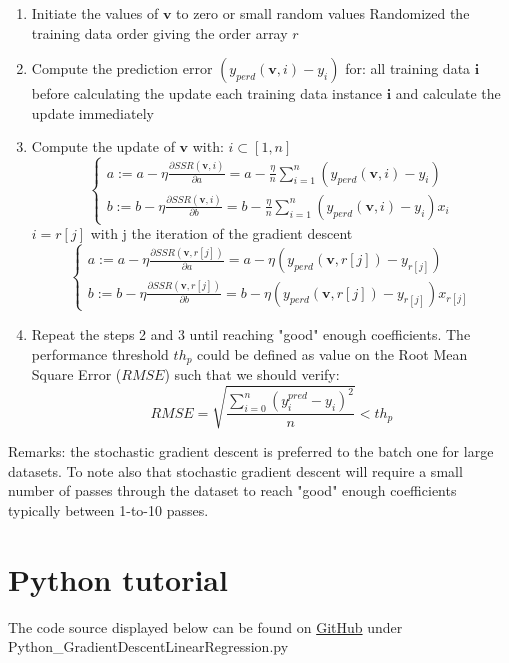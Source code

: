 \documentclass{article}
\begin{document}
\begin{enumerate}
  \item Initiate the values of \(\mathbf{v}\) to zero or small random values
     Randomized the training data order giving the order array \(r\)
  \item Compute the prediction error \((y_{perd}(\mathbf{v},i)-y_{i})\) for:
         all training data \(\mathbf{i}\) before calculating the update
         each training data instance \(\mathbf{i}\) and calculate the update immediately
  \item Compute the update of \(\mathbf{v}\) with: 
       \(i\subset[1,n]\)
        \begin{equation} \label{eq:4}
            \begin{cases}
            a := a - \eta\frac{\partial SSR(\mathbf{v}, i)}{\partial a} = a - \frac{\eta}{n}\sum_{i=1}^{n}(y_{perd}(\mathbf{v}, i)-y_{i})\\
            b := b - \eta\frac{\partial SSR(\mathbf{v}, i)}{\partial b} = b - \frac{\eta}{n}\sum_{i=1}^{n}(y_{perd}(\mathbf{v}, i)-y_{i})x_{i}
            \end{cases}
        \end{equation}
       \(i = r[j]\) with j the iteration of the gradient descent 
          \begin{equation} \label{eq:5}
            \begin{cases}
            a := a - \eta\frac{\partial SSR(\mathbf{v}, r[j])}{\partial a} = a - \eta(y_{perd}(\mathbf{v}, r[j])-y_{r[j]})\\
            b := b - \eta\frac{\partial SSR(\mathbf{v}, r[j])}{\partial b} = b - \eta(y_{perd}(\mathbf{v}, r[j])-y_{r[j]})x_{r[j]}
            \end{cases}
          \end{equation}
  \item Repeat the steps 2 and 3 until reaching "good" enough coefficients. The performance threshold \(th_{p}\) could be defined as value on the Root Mean Square Error (\(RMSE\)) such that we should verify:
    \begin{equation}
          RMSE = \sqrt{\frac{\sum_{i=0}^{n}(y_{i}^{pred} - y_{i})^{2}}{n}} < th_{p}
    \end{equation}
\end{enumerate}

Remarks: the stochastic gradient descent is preferred to the batch one for large datasets. To note also that stochastic gradient descent will require a small number of passes through the dataset to reach "good" enough coefficients typically between 1-to-10 passes. 

\newpage
\section{Python tutorial} \label{Python tutorial}
The code source displayed below can be found on \href{https://github.com/SophMarch/Tutorials}{GitHub} under Python\_GradientDescentLinearRegression.py

\end{document}
